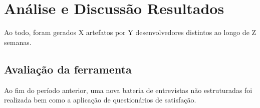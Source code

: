 \chapter{Análise e Discussão Resultados}

Ao todo, foram gerados X artefatos por Y desenvolvedores distintos ao longo de Z semanas.

\section{Avaliação da ferramenta}

Ao fim do período anterior, uma nova bateria de entrevistas não estruturadas foi realizada bem como a aplicação de questionários de satisfação.
